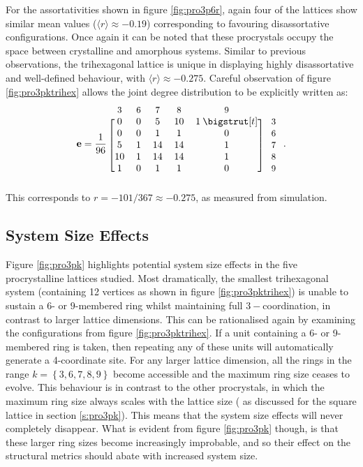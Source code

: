 For the assortativities shown in figure \ref{fig:pro3p6r}, again four of the lattices show similar mean values ($\langle r \rangle\approx -0.19$) corresponding to favouring disassortative configurations. 
Once again it can be noted that these procrystals occupy the space between crystalline and amorphous systems.
Similar to previous observations, the trihexagonal lattice is unique in displaying highly disassortative and well\--defined behaviour, with $\langle r \rangle \approx -0.275$.
Careful observation of figure \ref{fig:pro3pktrihex} allows the joint degree distribution to be explicitly written as: %
\begin{equation}
	\mathbf{e} = \frac{1}{96}\: \begin{blockarray}{*{5}{c} l}
	\begin{block}{*{5}{>{$\footnotesize}c<{$}} l}
	3 & 6 & 7 & 8 & 9 \\
	\end{block}
	\begin{block}{[*{5}{c}]>{$\footnotesize}l<{$}}
	0 & 0 & 5 & 10 & 1\: \bigstrut[t]& \:3\\
	0 & 0 & 1 & 1 & 0 & \:6 \\
	5 & 1 & 14 & 14 & 1 & \:7\\
	10 & 1 & 14 & 14 & 1 & \:8\\
	1 & 0 & 1 & 1 & 0 & \:9\\
	\end{block}
	\end{blockarray}\,.
\end{equation} 
This corresponds to $r=-101/367\approx -0.275$, as measured from simulation.

\subsection{System Size Effects}

Figure \ref{fig:pro3pk} highlights potential system size effects in the five procrystalline lattices studied.
Most dramatically, the smallest trihexagonal system (containing 12 vertices as shown in figure \ref{fig:pro3pktrihex}) is unable to sustain a $6$\-- or $9$\--membered ring whilst maintaining full $3-$coordination, in contrast to larger lattice dimensions.
This can be rationalised again by examining the configurations from figure \ref{fig:pro3pktrihex}.
If a unit containing a 6\-- or 9\--membered ring is taken, then repeating any of these units will automatically generate a 4\--coordinate site. 
For any larger lattice dimension, all the rings in the range $k=\left\{3,6,7,8,9\right\}$ become accessible and the maximum ring size ceases to evolve.
This behaviour is in contrast to the other procrystals, in which the maximum ring size always scales with the lattice size (\eg{} as discussed for the square lattice in section \ref{s:pro3pk}).
This means that the system size effects will never completely disappear.
What is evident from figure \ref{fig:pro3pk} though, is that these larger ring sizes become increasingly improbable, and so their effect on the structural metrics should abate with increased system size.

